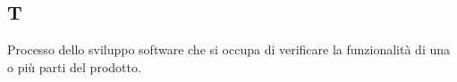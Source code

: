 \begin{center}
\section*{T}
\end{center}
Processo dello sviluppo software che si occupa di verificare la funzionalità di una o più parti del prodotto.
